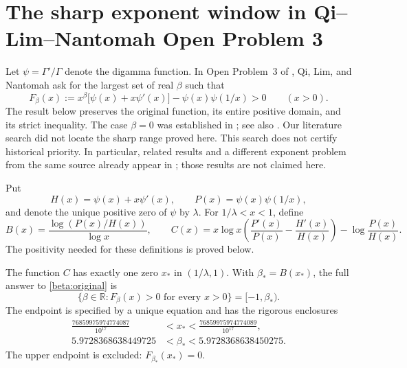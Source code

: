 \section{The sharp exponent window in Qi--Lim--Nantomah Open Problem 3}
\label{beta:section}

Let $\psi=\Gamma'/\Gamma$ denote the digamma function. In Open Problem~3
of \cite[Section~4]{QLN2025}, Qi, Lim, and Nantomah ask for the largest set
of real $\beta$ such that
\begin{equation}\label{beta:original}
 F_\beta(x):=x^\beta\bigl[\psi(x)+x\psi'(x)\bigr]
                 -\psi(x)\psi(1/x)>0\qquad(x>0).
\end{equation}
The result below preserves the original function, its entire positive domain,
and its strict inequality. The case $\beta=0$ was established in
\cite{QLN2025}; see also \cite{SLQ2026}. Our literature search did not locate
the sharp range proved here. This search does not certify historical priority.
In particular, related results and a different exponent problem from the same
source already appear in \cite{Pudim}; those results are not claimed here.

Put
\begin{equation}\label{beta:HP}
 H(x)=\psi(x)+x\psi'(x),\qquad P(x)=\psi(x)\psi(1/x),
\end{equation}
and denote the unique positive zero of $\psi$ by $\lambda$.
For $1/\lambda<x<1$, define
\begin{equation}\label{beta:BC}
 B(x)=\frac{\log(P(x)/H(x))}{\log x},\qquad
 C(x)=x\log x\left(\frac{P'(x)}{P(x)}-\frac{H'(x)}{H(x)}\right)
                          -\log\frac{P(x)}{H(x)}.
\end{equation}
The positivity needed for these definitions is proved below.

\begin{theorem}\label{beta:main}
The function $C$ has exactly one zero $x_*$ in $(1/\lambda,1)$.
With $\beta_*=B(x_*)$, the full answer to \eqref{beta:original} is
\begin{equation}\label{beta:answer}
 \bigl\{\beta\in\mathbb R:F_\beta(x)>0\text{ for every }x>0\bigr\}
       =[-1,\beta_*).
\end{equation}
The endpoint is specified by a unique equation and has the rigorous enclosures
\begin{align}
 \frac{76859975974774087}{10^{17}}
       &<x_*<\frac{76859975974774089}{10^{17}},\label{beta:rootbox}\\
 5.9728368638449725&<\beta_*<5.9728368638450275.
 \label{beta:thresholdbox}
\end{align}
The upper endpoint is excluded: $F_{\beta_*}(x_*)=0$.
\end{theorem}

